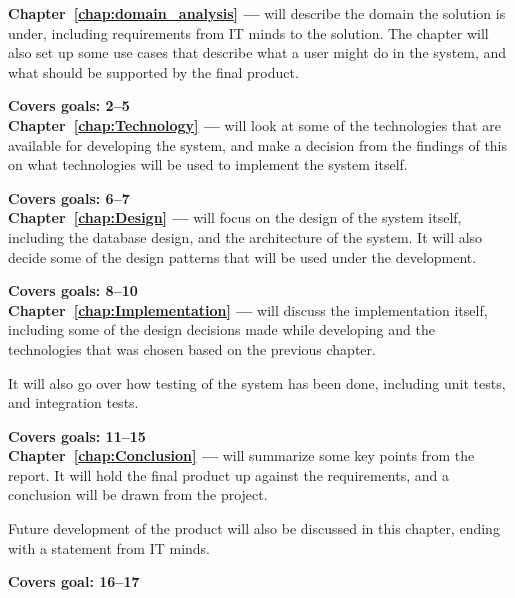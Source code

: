 \textbf{Chapter~\ref{chap:domain_analysis} --- }
will describe the domain the solution is under, including requirements from IT
minds to the solution. The chapter will also set up some use cases that
describe what a user might do in the system, and what should be supported by the
final product. 

\textbf{Covers goals: 2--5}\\

\textbf{Chapter~\ref{chap:Technology} --- } will look at
some of the technologies that are available for developing the system, and make
a decision from the findings of this on what technologies will be used to
implement the system itself. 

\textbf{Covers goals: 6--7}\\

\textbf{Chapter~\ref{chap:Design} --- } will focus on the
design of the system itself, including the database design, and the architecture
of the system. It will also decide some of the design patterns that will be used
under the development. 

\textbf{Covers goals: 8--10}\\

\textbf{Chapter~\ref{chap:Implementation} --- } will
discuss the implementation itself, including some of the design decisions made
while developing and the technologies that was chosen based on the previous
chapter. 

It will also go over how testing of the system has been done, including unit
tests, and integration tests. 

\textbf{Covers goals: 11--15}\\


\textbf{Chapter~\ref{chap:Conclusion} --- } will
summarize some key points from the report. It will hold the final product up
against the requirements, and a conclusion will be drawn from the project.

Future development of the product will also be discussed in this chapter, ending
with a statement from IT minds. 

\textbf{Covers goal: 16--17}
